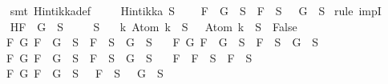 \begin{isabellebody}
%
\isadelimproof
\ \ %
\endisadelimproof
%
\isatagproof
{}\isamarkupfalse%
\ {\isacharparenleft}smt\ Hintikka{\isacharunderscore}def{\isacharparenright}%
\endisatagproof
{\isafoldproof}%
%
\isadelimproof
\isanewline
%
\endisadelimproof
\isanewline
{}\isamarkupfalse%
\ \isanewline
\ \ \ {\isachardoublequoteopen}Hintikka\ S{\isachardoublequoteclose}\ \isanewline
\ \ \ {\isachardoublequoteopen}\isactrlbold {\isasymnot}{\isacharparenleft}F\ \isactrlbold {\isasymrightarrow}\ G{\isacharparenright}\ {\isasymin}\ S\ {\isasymlongrightarrow}\ F\ {\isasymin}\ S\ {\isasymand}\ \isactrlbold {\isasymnot}\ G\ {\isasymin}\ S{\isachardoublequoteclose}\isanewline
%
\isadelimproof
%
\endisadelimproof
%
\isatagproof
{}\isamarkupfalse%
\ {\isacharparenleft}rule\ impI{\isacharparenright}\isanewline
\ \ \isamarkupfalse%
\ H{\isacharcolon}{\isachardoublequoteopen}\isactrlbold {\isasymnot}{\isacharparenleft}F\ \isactrlbold {\isasymrightarrow}\ G{\isacharparenright}\ {\isasymin}\ S{\isachardoublequoteclose}\isanewline
\ \isamarkupfalse%
\ {\isachardoublequoteopen}{\isasymbottom}\ {\isasymnotin}\ S\isanewline
\ \ {\isasymand}\ {\isacharparenleft}{\isasymforall}k{\isachardot}\ Atom\ k\ {\isasymin}\ S\ {\isasymlongrightarrow}\ \isactrlbold {\isasymnot}\ {\isacharparenleft}Atom\ k{\isacharparenright}\ {\isasymin}\ S\ {\isasymlongrightarrow}\ False{\isacharparenright}\isanewline
\ \ {\isasymand}\ {\isacharparenleft}{\isasymforall}F\ G{\isachardot}\ F\ \isactrlbold {\isasymand}\ G\ {\isasymin}\ S\ {\isasymlongrightarrow}\ F\ {\isasymin}\ S\ {\isasymand}\ G\ {\isasymin}\ S{\isacharparenright}\isanewline
\ \ {\isasymand}\ {\isacharparenleft}{\isasymforall}F\ G{\isachardot}\ F\ \isactrlbold {\isasymor}\ G\ {\isasymin}\ S\ {\isasymlongrightarrow}\ F\ {\isasymin}\ S\ {\isasymor}\ G\ {\isasymin}\ S{\isacharparenright}\isanewline
\ \ {\isasymand}\ {\isacharparenleft}{\isasymforall}F\ G{\isachardot}\ F\ \isactrlbold {\isasymrightarrow}\ G\ {\isasymin}\ S\ {\isasymlongrightarrow}\ \isactrlbold {\isasymnot}F\ {\isasymin}\ S\ {\isasymor}\ G\ {\isasymin}\ S{\isacharparenright}\isanewline
\ \ {\isasymand}\ {\isacharparenleft}{\isasymforall}F{\isachardot}\ \isactrlbold {\isasymnot}\ {\isacharparenleft}\isactrlbold {\isasymnot}F{\isacharparenright}\ {\isasymin}\ S\ {\isasymlongrightarrow}\ F\ {\isasymin}\ S{\isacharparenright}\isanewline
\ \ {\isasymand}\ {\isacharparenleft}{\isasymforall}F\ G{\isachardot}\ \isactrlbold {\isasymnot}{\isacharparenleft}F\ \isactrlbold {\isasymand}\ G{\isacharparenright}\ {\isasymin}\ S\ {\isasymlongrightarrow}\ \isactrlbold {\isasymnot}\ F\ {\isasymin}\ S\ {\isasymor}\ \isactrlbold {\isasymnot}\ G\ {\isasymin}\ S{\isacharparenright}\isanewline

\end{isabellebody}
